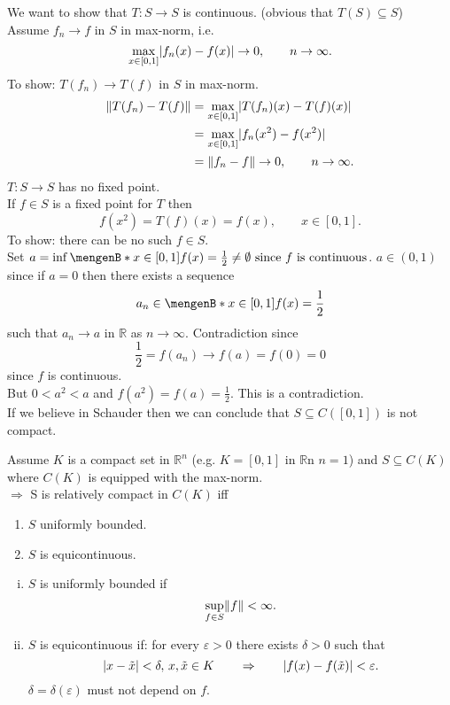 \begin{beispiel}
	We want to show that $T: S \to S$ is continuous. (obvious that $T(S) \subseteq S$)\\ Assume $f_n \to f$ in $S$ in max-norm, i.e.
	\[
		\max_{x \in [0,1]} \lvert f_n(x)-f(x)\rvert \to 0, \qquad n \to \infty.
	\]
	To show: $T(f_n) \to T(f)$ in $S$ in max-norm.
	\begin{align*}
		\norm{T(f_n)-T(f)} &= \max_{x \in [0,1]}\abs{T(f_n)(x)- T(f)(x)} \\ & = \max_{x \in [0,1]}\abs{f_n(x^2)-f(x^2)}  \\ &= \norm{f_n -f} \to 0, \qquad n \to \infty.
	\end{align*}
	$T: S \to S $ has no fixed point. \\
	If $f \in S$ is a fixed point for $T$ then 
	\[
		f(x^2) = T(f)(x) = f(x), \qquad x \in [0,1].
	\]
	To show: there can be no such $f \in S$. \\
	Set $a = \inf \set[x \in [0,1]]{f(x) = \frac{1}{2}} \neq \emptyset \text{ since $f$ is continuous}$. $a \in (0,1)$ since if $a = 0$ then there exists a sequence
	\[
		a_n \in \set[x \in [0,1]]{f(x)= \frac{1}{2}} 
	\]
	such that $a_n \to a$ in $\mathbb{R}$ as $n \to \infty$. Contradiction since 
	\[
		\frac{1}{2} = f(a_n) \to f(a) = f(0) = 0
	\]
	since $f$ is continuous. \\
	But $0 < a^2 < a$ and $f(a^2) = f(a) = \frac{1}{2}$. This is a contradiction. \\
	If we believe in Schauder then we can conclude that $S \subseteq C([0,1])$ is not compact.
\end{beispiel}
\begin{theorem}
	Assume $K$ is a compact set in $\mathbb{R}^n$ (e.g. $K = [0,1]$ in $\mathbb{R}$n $n=1$) and $S \subseteq C(K)$ where $C(K)$ is equipped with the max-norm. \\
	$\Rightarrow $ S is relatively compact in $C(K)$ iff
	\begin{enumerate}[(1)]
		\item $S$ uniformly bounded.
		\item $S$ is equicontinuous.
	\end{enumerate}
\end{theorem}
\begin{definition*}
	\begin{enumerate}[(i)]
		\item $S$ is uniformly bounded if
		\[
			\sup\limits_{f \in S} \norm{f} < \infty.
		\]
		\item $S$ is equicontinuous if: for every $\varepsilon >0$ there exists $\delta >0$ such that
		\[
			\lvert x- \tilde x\rvert < \delta, \, x, \tilde x \in K \qquad \Rightarrow \qquad \lvert f(x)-f(\tilde x)\rvert< \varepsilon.
		\]
		$\delta = \delta (\varepsilon)$ must not depend on $f$. \\
	\end{enumerate}
\end{definition*}
